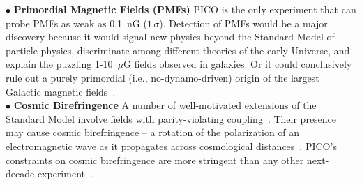 \documentclass[PICOAPC.tex]{subfiles}
\begin{document}
%
$\bullet$ {\bf Primordial Magnetic Fields (PMFs)} \hspace{0.1in} PICO is the only experiment that can probe PMFs as weak as 0.1~nG ($1\,\sigma$).  Detection of PMFs would be a major discovery because it would signal new physics beyond the Standard Model of particle physics, discriminate among different theories of the early Universe, and explain the puzzling 1-10~$\mu$G fields observed in galaxies.  Or it could conclusively rule out a purely primordial (i.e., no-dynamo-driven) origin of the largest Galactic magnetic fields~\citep{Widrow:2002ud,Widrow:2011hs,Athreya:1998,Grasso:2000wj,Vachaspati:1991nm,Turner:1987bw,Ratra:1991bn,DiazGil:2007dy,Barnaby:2012tk,Long:2013tha,Durrer:2013pga}. \\
%
$\bullet$ {\bf Cosmic Birefringence} \hspace{0.1in}
A number of well-motivated extensions of the Standard Model involve fields with parity-violating coupling~\citep{Freese:1990rb,Frieman:1995pm,Carroll:1998zi,Kaloper:2005aj,2008PhRvL.101n1101C,Gluscevic:2010vv}. Their presence may cause cosmic birefringence -- a rotation of the polarization of an electromagnetic wave as it propagates across cosmological distances~\cite{Harari:1992ea,Carroll:1989vb,Carroll:1998zi}. PICO's constraints on cosmic birefringence are more stringent than any other next-decade experiment~\cite{pogosian_2019}. 
\end{document}

